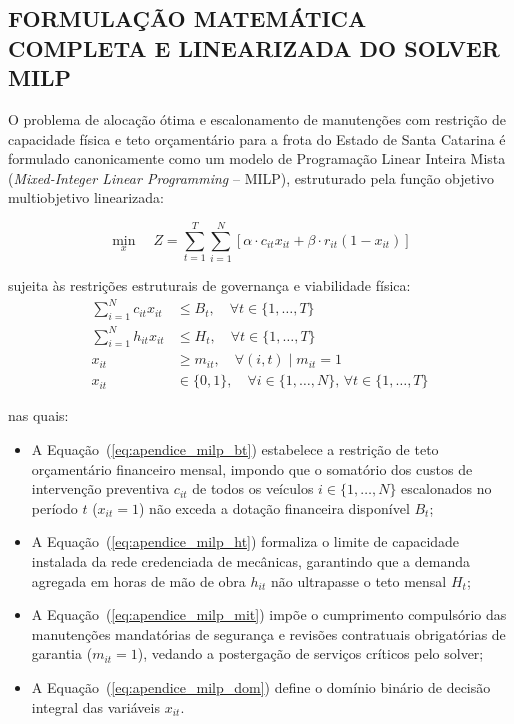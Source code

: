 \begin{apendicesenv}
\partapendices

\chapter{FORMULAÇÃO MATEMÁTICA COMPLETA E LINEARIZADA DO SOLVER MILP}
\label{apendice:a}

O problema de alocação ótima e escalonamento de manutenções com restrição de capacidade física e teto orçamentário para a frota do Estado de Santa Catarina é formulado canonicamente como um modelo de Programação Linear Inteira Mista (\textit{Mixed-Integer Linear Programming} -- MILP), estruturado pela função objetivo multiobjetivo linearizada:

\begin{equation}
    \min_{x} \quad Z = \sum_{t=1}^T \sum_{i=1}^N \left[ \alpha \cdot c_{it} x_{it} + \beta \cdot r_{it} (1 - x_{it}) \right]
    \label{eq:apendice_milp_obj}
\end{equation}

\noindent sujeita às restrições estruturais de governança e viabilidade física:
\begin{align}
    \sum_{i=1}^N c_{it} x_{it} &\le B_t, \quad \forall t \in \{1, \dots, T\} \label{eq:apendice_milp_bt} \\
    \sum_{i=1}^N h_{it} x_{it} &\le H_t, \quad \forall t \in \{1, \dots, T\} \label{eq:apendice_milp_ht} \\
    x_{it} &\ge m_{it}, \quad \forall (i, t) \mid m_{it} = 1 \label{eq:apendice_milp_mit} \\
    x_{it} &\in \{0, 1\}, \quad \forall i \in \{1, \dots, N\}, \, \forall t \in \{1, \dots, T\} \label{eq:apendice_milp_dom}
\end{align}

\noindent nas quais:
\begin{itemize}
    \item A Equação~(\ref{eq:apendice_milp_bt}) estabelece a restrição de teto orçamentário financeiro mensal, impondo que o somatório dos custos de intervenção preventiva $c_{it}$ de todos os veículos $i \in \{1, \dots, N\}$ escalonados no período $t$ ($x_{it} = 1$) não exceda a dotação financeira disponível $B_t$;
    \item A Equação~(\ref{eq:apendice_milp_ht}) formaliza o limite de capacidade instalada da rede credenciada de mecânicas, garantindo que a demanda agregada em horas de mão de obra $h_{it}$ não ultrapasse o teto mensal $H_t$;
    \item A Equação~(\ref{eq:apendice_milp_mit}) impõe o cumprimento compulsório das manutenções mandatórias de segurança e revisões contratuais obrigatórias de garantia ($m_{it} = 1$), vedando a postergação de serviços críticos pelo solver;
    \item A Equação~(\ref{eq:apendice_milp_dom}) define o domínio binário de decisão integral das variáveis $x_{it}$.
\end{itemize}


\end{apendicesenv}
